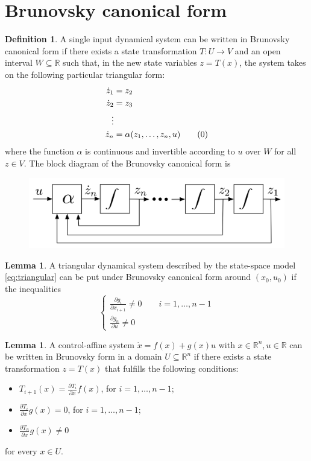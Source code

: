 \documentclass[12pt, openany]{report}
\theoremstyle{definition}
\newtheorem{definition}[thm]{Definition}
\newtheorem{lem}[thm]{Lemma}
\newcommand{\R}{\mathbb{R}}
\begin{document}
\section{Brunovsky canonical form}
\begin{definition} A single input dynamical system can be written in Brunovsky canonical form if there exists a state transformation \(T:U\rightarrow V\) and an open interval \(W\subseteq \R\) such that, in the new state variables \(z=T(x)\), the system takes on the following particular triangular form:
\begin{align}
    \dot z_1 &= z_2\nonumber\\
    \dot z_2 &= z_3\nonumber\\
    \vdots&\nonumber\\
    \dot z_n &= \alpha(z_1,\dots,z_n,u)\tag{\theequation}  \refstepcounter{equation}
\end{align}
where the function \(\alpha\) is continuous and invertible according to \(u\) over \(W\) for all \(z\in V\). The block diagram of the Brunovsky canonical form is
\begin{figure}[H]
    \centering
    \includegraphics[width = .5\textwidth]{img/block_brunovsky.png}
\end{figure}
\end{definition}
\begin{lem}
    A triangular dynamical system described by the state-space model \eqref{eq:triangular} can be put under Brunovsky canonical form around \((x_0,u_0)\) if the inequalities 
    \begin{equation}
        \begin{cases}
            \frac{\partial g_i}{\partial x_{i+1}}\neq 0 \qquad i=1,\dots,n-1\\
            \frac{\partial g_n}{\partial u}\neq 0
        \end{cases}
    \end{equation}
\end{lem}
\begin{lem}
    A control-affine system \(\dot x =f(x)+g(x)u\) with \(x\in \R^n,u\in \R\) can be written in Brunovsky form in a domain \(U\subseteq \R^n\) if there exists a state transformation \(z=T(x)\) that fulfills the following conditions:
\end{lem}
\begin{itemize}
    \item \(T_{i+1}(x) = \frac{\partial T_i}{\partial x}f(x)\), for \(i=1,\dots,n-1\);
    \item \(\frac{\partial T_i}{\partial x}g(x)= 0\), for \(i=1,\dots,n-1\);
    \item \(\frac{\partial T_n}{\partial x}g(x)\neq 0\)
\end{itemize}
for every \(x\in U\).
\end{document}
